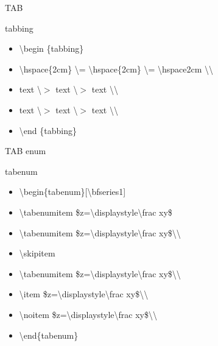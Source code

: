 \documentclass[ aspectratio=149,  10pt,blue,xcolor=pdftex,dvipsnames,table,handout,notes]{beamer}
\begin{document}
		\begin{frame}[t]{TAB}

		\begin{block}{tabbing}
		\begin{itemize}
		\item[]	\textbackslash begin \{tabbing\}
		\item[]	\textbackslash hspace\{2cm\}	\textbackslash = 
				\textbackslash hspace\{2cm\}	\textbackslash = 
				\textbackslash hspace{2cm}	
				\textbackslash \textbackslash 

		\item[]	text	\textbackslash $>$
				text	\textbackslash $>$
				text	\textbackslash\textbackslash

		\item[]	text	\textbackslash $>$
				text	\textbackslash $>$
				text	\textbackslash\textbackslash

		\item[]	\textbackslash end \{tabbing\}
		\end{itemize}

		\end{block}


		\end{frame}


		\begin{frame}[t]{TAB enum}

		\begin{block}{tabenum}
		\begin{itemize}
		\item[]	\textbackslash begin\{tabenum\}[\textbackslash bfseries1]
		\item[]	\textbackslash tabenumitem 		\$z=\textbackslash displaystyle\textbackslash frac xy\$
		\item[]	\textbackslash tabenumitem 		\$z=\textbackslash displaystyle\textbackslash frac xy\$\textbackslash\textbackslash 
		\item[]	\textbackslash skipitem
		\item[]	\textbackslash tabenumitem 		\$z=\textbackslash displaystyle\textbackslash frac xy\$\textbackslash\textbackslash 
		\item[]	\textbackslash item 			\$z=\textbackslash displaystyle\textbackslash frac xy\$\textbackslash\textbackslash 
		\item[]	\textbackslash noitem 			\$z=\textbackslash displaystyle\textbackslash frac xy\$\textbackslash\textbackslash 
		\item[]	\textbackslash end\{tabenum\}
		\end{itemize}
		\end{block}

		\end{frame}
\end{document}
